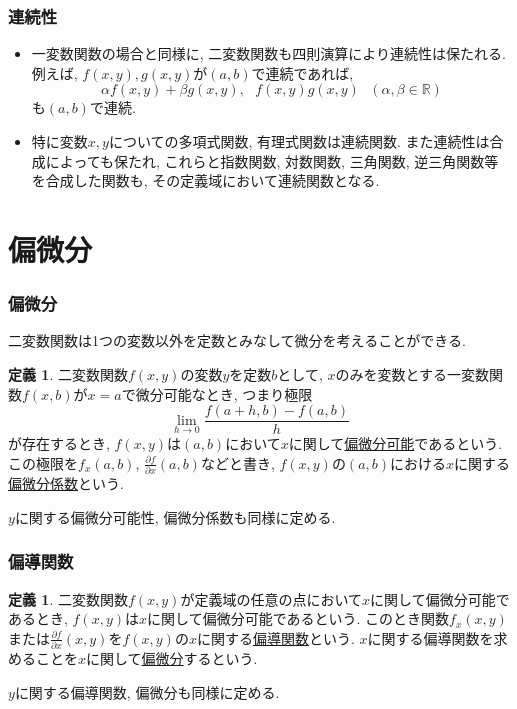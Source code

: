 \documentclass[dvipdfmx,cjk,10.2pt]{beamer}
\newcommand{\R}{\mathbb{R}}
\theoremstyle{definition}
\newtheorem{Def}[Thm]{定義}
\begin{document}
\begin{frame}
\frametitle{連続性}

\begin{itemize}
\item 一変数関数の場合と同様に, 二変数関数も四則演算により連続性は保たれる. 
例えば, $f(x,y),g(x,y)$が$(a,b)$で連続であれば, 
$$
\alpha f(x,y)+\beta g(x,y), \ \ \ f(x,y)g(x,y) \ \ \ (\alpha,\beta \in \R)
$$
も$(a,b)$で連続. 
\item 特に変数$x,y$についての多項式関数, 有理式関数は連続関数.  
また連続性は合成によっても保たれ, これらと指数関数, 対数関数, 三角関数, 逆三角関数等を合成した関数も, その定義域において連続関数となる.　 
\end{itemize}

\end{frame}





\section{偏微分}


\begin{frame}
\frametitle{偏微分}

二変数関数は1つの変数以外を定数とみなして微分を考えることができる. 

\begin{Def}
二変数関数$f(x,y)$の変数$y$を定数$b$として, $x$のみを変数とする一変数関数$f(x,b)$が$x=a$で微分可能なとき, つまり極限
$$
\lim_{h \to 0} \frac{f(a+h,b)-f(a,b)}{h}
$$
が存在するとき, $f(x,y)$は$(a,b)$において$x$に関して\underline{偏微分可能}であるという. 
この極限を$f_x(a,b)$, $\frac{\partial f}{\partial x}(a,b)$などと書き, 
$f(x,y)$の$(a,b)$における$x$に関する\underline{偏微分係数}という. 
\end{Def}
$y$に関する偏微分可能性, 偏微分係数も同様に定める. 

\end{frame}





\begin{frame}
\frametitle{偏導関数}

\begin{Def}
二変数関数$f(x,y)$が定義域の任意の点において$x$に関して偏微分可能であるとき, $f(x,y)$は$x$に関して偏微分可能であるという. 
このとき関数$f_x(x,y)$または$\frac{\partial f}{\partial x}(x,y)$を$f(x,y)$の$x$に関する\underline{偏導関数}という. 
$x$に関する偏導関数を求めることを$x$に関して\underline{偏微分}するという. 
\end{Def}
$y$に関する偏導関数, 偏微分も同様に定める. 


\end{frame}
\end{document}
